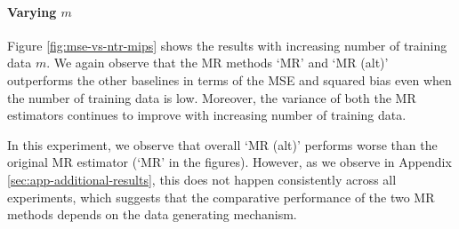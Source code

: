 \paragraph{Varying $m$}
Figure \ref{fig:mse-vs-ntr-mips} shows the results with increasing number of training data $m$. We again observe that the MR methods `MR' and `MR (alt)' outperforms the other baselines in terms of the MSE and squared bias even when the number of training data is low. Moreover, the variance of both the MR estimators continues to improve with increasing number of training data.

In this experiment, we observe that overall `MR (alt)' performs worse than the original MR estimator (`MR' in the figures). However, as we observe in Appendix \ref{sec:app-additional-results}, this does not happen consistently across all experiments, which suggests that the comparative performance of the two MR methods depends on the data generating mechanism. 




